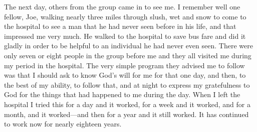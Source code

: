 \begin{biblechapter}
\verse The next day, 
    others from the group came in to see me.
\verse I remember well one fellow, Joe, 
    walking nearly three miles through slush, wet and snow 
    to come to the hospital to see a man 
    that he had never seen before in his life, 
    and that impressed me very much.
\verse He walked to the hospital to save bus fare 
    and did it gladly in order to be helpful 
    to an individual he had never even seen.
\verse There were only seven or eight people in the group before me 
    and they all visited me during my period in the hospital.
\verse The very simple program they advised me to follow 
    was that I should ask to know God’s will for me for that one day, 
    and then, to the best of my ability, 
    to follow that, 
    and at night to express my gratefulness to God 
    for the things that had happened to me during the day.
\verse When I left the hospital I tried this for a day and it worked, 
    for a week and it worked, 
    and for a month, and it worked—and 
    then for a year and it still worked.
\verse It has continued to work now for nearly eighteen years.
\end{biblechapter}
